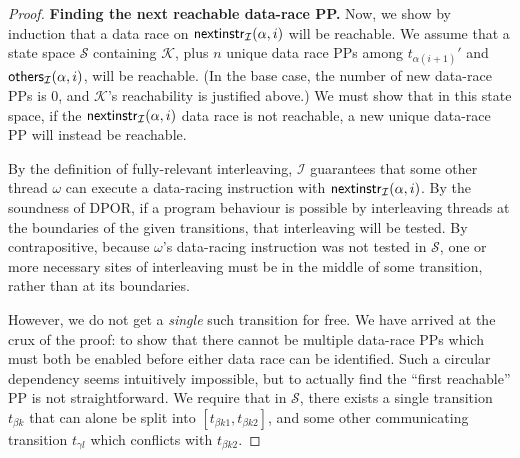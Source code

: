 \begin{proof}
\newcommand\tbk{\ensuremath{t_{\beta{}k}}}
\newcommand\tbka{\ensuremath{t_{\beta{}k1}}}
\newcommand\tbkb{\ensuremath{t_{\beta{}k2}}}
\newcommand\tgl{\ensuremath{t_{\gamma{}l}}}

{\bf Finding the next reachable data-race PP.}
Now, we show by induction that a data race on $\mathsf{nextinstr}_{\mathcal{I}}(\alpha,i)$ will be reachable.
We assume that a state space $\mathcal{S}$ containing $\mathcal{K}$,
plus $n$ unique data race PPs among $t_{\alpha{}(i+1)}'$ and $\mathsf{others}_{\mathcal{I}}(\alpha,i)$,
will be reachable.
(In the base case, the number of new data-race PPs is 0, and $\mathcal{K}$'s reachability is justified above.)
We must show that in this state space, if the $\mathsf{nextinstr}_{\mathcal{I}}(\alpha,i)$ data race is not reachable,
a new unique data-race PP will instead be reachable.

By the definition of fully-relevant interleaving, $\mathcal{I}$ guarantees that some other thread $\omega$ can execute a data-racing instruction with $\mathsf{nextinstr}_{\mathcal{I}}(\alpha,i)$.
%
By the soundness of DPOR, if a program behaviour is possible by interleaving threads at the boundaries of
the given transitions, that interleaving will be tested.
By contrapositive,
because $\omega$'s data-racing instruction was not tested in $\mathcal{S}$, one or more necessary sites of interleaving must be in the middle of some transition, rather than at its boundaries.

However, we do not get a {\em single} such transition for free.
We have arrived at the crux of the proof:
to show that there cannot be multiple data-race PPs which must both be enabled before either data race can be identified.
Such a circular dependency seems intuitively impossible, but to actually find the ``first reachable'' PP is not straightforward.
We require that in $\mathcal{S}$, there exists a single transition $\tbk$ that can alone be split into $[\tbka,\tbkb]$,
and some other communicating transition $\tgl$ which conflicts with $\tbkb$.


\end{proof}
